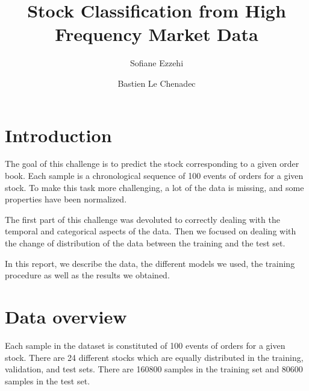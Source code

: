 \documentclass[switch, 11pt]{article}
\title{Stock Classification from High Frequency Market Data}
\author[1]{Sofiane Ezzehi}
\author[1]{Bastien Le Chenadec}
\affil[1]{École des Ponts ParisTech, Master MVA}
\begin{document}
\maketitle

\begin{contribstatement}
\end{contribstatement}

\begin{multicols}{2}
    \section{Introduction}

    The goal of this challenge is to predict the stock corresponding to a given order book. Each sample is a chronological sequence of 100 events of orders for a given stock. To make this task more challenging, a lot of the data is missing, and some properties have been normalized.

    The first part of this challenge was devoluted to correctly dealing with the temporal and categorical aspects of the data. Then we focused on dealing with the change of distribution of the data between the training and the test set.

    In this report, we describe the data, the different models we used, the training procedure as well as the results we obtained.

    \section{Data overview}

    Each sample in the dataset is constituted of 100 events of orders for a given stock. There are 24 different stocks which are equally distributed in the training, validation, and test sets. There are 160800 samples in the training set and 80600 samples in the test set.


\end{multicols}
\end{document}
